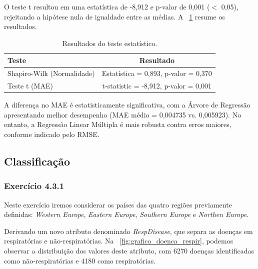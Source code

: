\documentclass[conference]{IEEEtran}
\begin{document}
O teste t resultou em uma estatística de -8,912 e p-valor de 0,001 ($<$ 0,05), rejeitando a hipótese nula de igualdade entre as médias. A \tablename~\ref{tab:stat_test} resume os resultados.

\begin{table}[h]
	\centering
	\caption{Resultados do teste estatístico.}
	\label{tab:stat_test}
	\begin{tabular}{lc}
		\toprule
		\textbf{Teste} & \textbf{Resultado} \\
		\midrule
		Shapiro-Wilk (Normalidade) & Estatística = 0,893, p-valor = 0,370 \\
		Teste t (MAE) & t-statistic = -8,912, p-valor = 0,001 \\
		\bottomrule
	\end{tabular}
\end{table}

A diferença no MAE é estatisticamente significativa, com a Árvore de Regressão apresentando melhor desempenho (MAE médio = 0,004735 vs. 0,005923). No entanto, a Regressão Linear Múltipla é mais robusta contra erros maiores, conforme indicado pelo RMSE.


\subsection{Classificação}\label{AA}

\subsubsection{\textbf{Exercício 4.3.1}}

Neste exercício iremos considerar os países das quatro regiões previamente definidas: \textit{Western Europe}, \textit{Eastern Europe}, \textit{Southern Europe} e \textit{Northen Europe}.

Derivando um novo atributo denominado \textit{RespDisease}, que separa as doenças em respiratórias e não-respiratórias. Na \figurename~\ref{fig:grafico_doenca_respir}, podemos observar a distribuição dos valores deste atributo, com 6270 doenças identificadas como não-respiratórias e 4180 como respiratórias.
\end{document}
